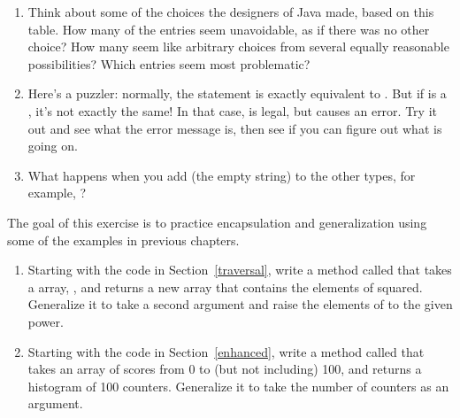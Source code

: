 \begin{exercise}
\begin{enumerate}
\item Think about some of the choices the designers of Java made, based on this table.
How many of the entries seem unavoidable, as if there was no other choice?
How many seem like arbitrary choices from several equally reasonable possibilities?
Which entries seem most problematic?

\item Here's a puzzler: normally, the statement  is exactly equivalent to .
But if  is a , it's not exactly the same!
In that case,  is legal, but  causes an error.
Try it out and see what the error message is, then see if you can figure out what is going on.

\item What happens when you add  (the empty string) to the other types, for example, ?


\end{enumerate}

\end{exercise}


\begin{exercise}  %

The goal of this exercise is to practice encapsulation and generalization using some of the examples in previous chapters.

\begin{enumerate}

\item Starting with the code in Section~\ref{traversal}, write a method called  that takes a  array, , and returns a new array that contains the elements of  squared.
Generalize it to take a second argument and raise the elements of  to the given power.

\item Starting with the code in Section~\ref{enhanced}, write a method called  that takes an  array of scores from 0 to (but not including) 100, and returns a histogram of 100 counters.
Generalize it to take the number of counters as an argument.

\end{enumerate}

\end{exercise}


